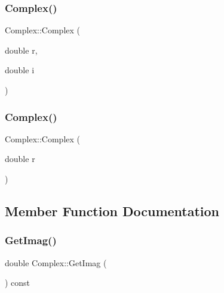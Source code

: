 \subsubsection{\texorpdfstring{Complex()}{Complex()}\hspace{0.1cm}{\footnotesize\ttfamily [1/2]}}
{\footnotesize\ttfamily Complex\+::\+Complex (\begin{DoxyParamCaption}\item[{double}]{r,  }\item[{double}]{i }\end{DoxyParamCaption})\hspace{0.3cm}{\ttfamily [inline]}}

\mbox{\label{class_complex_a5ef29d91cbdfe6710c052f23c90d260d}} 
\subsubsection{\texorpdfstring{Complex()}{Complex()}\hspace{0.1cm}{\footnotesize\ttfamily [2/2]}}
{\footnotesize\ttfamily Complex\+::\+Complex (\begin{DoxyParamCaption}\item[{double}]{r }\end{DoxyParamCaption})\hspace{0.3cm}{\ttfamily [inline]}}



\subsection{Member Function Documentation}
\mbox{\label{class_complex_a9e7ef2ffabdac1acfe0f0efc0d58c247}} 
\subsubsection{\texorpdfstring{GetImag()}{GetImag()}}
{\footnotesize\ttfamily double Complex\+::\+Get\+Imag (\begin{DoxyParamCaption}{ }\end{DoxyParamCaption}) const\hspace{0.3cm}{\ttfamily [inline]}}

\mbox{\label{class_complex_adaca4ef2fbe97addb3654c94bd8a8438}} 
